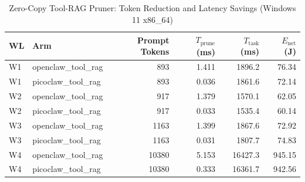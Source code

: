 \begin{table}[t]
\centering\small
\caption{Zero-Copy Tool-RAG Pruner: Token Reduction and Latency Savings (Windows 11 x86_64)}
\label{tab:Windows_tool_rag}
\begin{tabular}{llrrrr}
\toprule
WL & Arm & Prompt Tokens & $T_{\text{prune}}$ (ms) & $T_{\text{task}}$ (ms) & $E_{\text{net}}$ (J) \\
\midrule
W1 & openclaw\_tool\_rag & 893 & 1.411 & 1896.2 & 76.34 \\
W1 & picoclaw\_tool\_rag & 893 & 0.036 & 1861.6 & 72.14 \\
W2 & openclaw\_tool\_rag & 917 & 1.379 & 1570.1 & 62.05 \\
W2 & picoclaw\_tool\_rag & 917 & 0.033 & 1535.4 & 60.14 \\
W3 & openclaw\_tool\_rag & 1163 & 1.399 & 1867.6 & 72.92 \\
W3 & picoclaw\_tool\_rag & 1163 & 0.031 & 1807.7 & 74.83 \\
W4 & openclaw\_tool\_rag & 10380 & 5.153 & 16427.3 & 945.15 \\
W4 & picoclaw\_tool\_rag & 10380 & 0.333 & 16361.7 & 942.56 \\
\bottomrule
\end{tabular}
\end{table}
